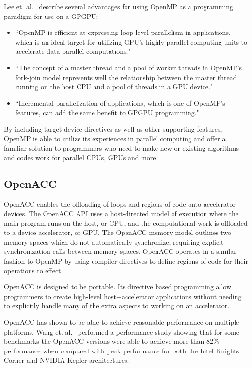 Lee et. al.~\cite{lee2009openmp} describe several advantages for using OpenMP as a programming paradigm for use on a GPGPU:
\begin{itemize}
\item ``OpenMP is efficient at expressing loop-level parallelism in applications, which is an ideal target for utilizing GPU's highly parallel computing units to accelerate data-parallel computations."
\item ``The concept of a master thread and a pool of worker threads in OpenMP's fork-join model represents well the relationship between the master thread running on the host CPU and a pool of threads in a GPU device."
\item ``Incremental parallelization of applications, which is one of OpenMP's features, can add the same benefit to GPGPU programming."~\cite{lee2009openmp}
\end{itemize}

By including target device directives as well as other supporting features, OpenMP is able to utilize its experiences in parallel computing and offer a familiar solution to programmers who need to make new or existing algorithms and codes work for parallel CPUs, GPUs and more.
\cite{ayguade2010extending}

\subsection*{\textbf{OpenACC}}

OpenACC enables the offloading of loops and regions of code onto accelerator devices.
%
The OpenACC API uses a host-directed model of execution where the main program runs on the host, or CPU, and the computational work is offloaded to a device accelerator, or GPU.
%
The OpenACC memory model outlines two memory spaces which do not automatically synchronize, requiring explicit synchronization calls between memory spaces.
%
OpenACC operates in a similar fashion to OpenMP by using compiler directives to define regions of code for their operations to effect.
\cite{wienke2012openacc}

OpenACC is designed to be portable.
%
Its directive based programming allow programmers to create high-level host+accelerator applications without needing to explicitly handle many of the extra aspects to working on an accelerator.
\cite{openacc}

OpenACC has shown to be able to achieve reasonable performance on multiple platforms.
%
Wang et. al.~\cite{wang2013performance} performed a performance study showing that for some benchmarks the OpenACC versions were able to achieve more than 82\% performance when compared with peak performance for both the Intel Knights Corner and NVIDIA Kepler architectures.

